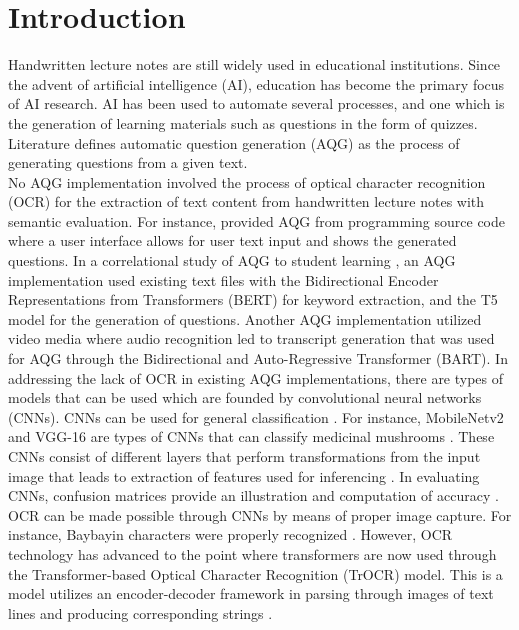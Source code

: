\documentclass[conference]{IEEEtran}
\begin{document}
\section{Introduction}
Handwritten lecture notes are still widely used in educational institutions.
Since the advent of artificial intelligence (AI), education has become
the primary focus of AI research. AI has been used to automate several processes,
and one which is the generation of learning materials such as questions in the
form of quizzes. Literature defines automatic question generation (AQG) as the
process of generating questions from a given text. \\
\indent No AQG implementation involved the process of optical character
recognition (OCR) for the extraction of text content from handwritten lecture 
notes with semantic evaluation. For instance, \cite{Gaur2023} provided 
AQG from programming source code where a user interface allows for user 
text input and shows the generated questions. In a correlational study of AQG 
to student learning \cite{Tsai2021}, an AQG implementation used existing text files with 
the Bidirectional Encoder Representations from Transformers (BERT) 
for keyword extraction, and the T5 model for the generation of questions.
Another AQG implementation utilized video media \cite{Ou2022} where audio recognition led 
to transcript generation that was used for AQG through the Bidirectional 
and Auto-Regressive Transformer (BART). In addressing the lack of OCR 
in existing AQG implementations, there are types of models that can be 
used which are founded by convolutional neural networks 
(CNNs). CNNs can be used for general classification \cite{Manlises2024}
\cite{Calimag2023}. For instance, 
MobileNetv2 and VGG-16 are types of CNNs that can classify 
medicinal mushrooms \cite{Sutayco2023}. These CNNs consist of 
different layers that perform transformations from the input image 
that leads to extraction of features used for inferencing \cite{Estrella2024}
\cite{Wata2023}. In evaluating CNNs, confusion matrices provide an illustration and computation 
of accuracy \cite{Bacalla2023} \cite{Baguisi2024}. OCR can be made possible
through CNNs by means of proper image capture. For instance, Baybayin 
characters were properly recognized \cite{Ligsay2022}. However, 
OCR technology has advanced to the point where transformers are now used 
through the Transformer-based Optical Character Recognition (TrOCR) model. 
This is a model utilizes an encoder-decoder framework in parsing through 
images of text lines and producing corresponding strings \cite{Li2021}. 
\end{document}
